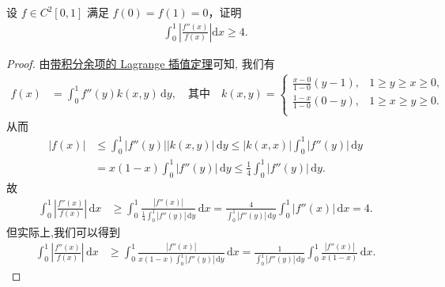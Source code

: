 \documentclass[../../main.tex]{subfiles}%
\begin{document}
\begin{example}
设 $f \in C^2[0,1]$ 满足 $f(0) = f(1) = 0$，证明
\begin{align*}
\int_{0}^{1} \left| \frac{f''(x)}{f(x)} \right| \mathrm{d}x \geqslant  4.
\end{align*}
\end{example}
\begin{proof}

由\hyperref[theorem:带积分型余项的Lagrange插值公式]{带积分余项的 Lagrange 插值定理}可知, 我们有
\begin{align*}
f(x) &= \int_0^1 f''(y) k(x,y) \, \mathrm{d}y, \quad \text{其中} \quad k(x,y) = 
\begin{cases}
\frac{x-0}{1-0}(y-1),&		1\geqslant y\geqslant x\geqslant 0,\\
\frac{1-x}{1-0}(0-y),&		1\geqslant x\geqslant y\geqslant 0.\\
\end{cases}
\end{align*}
从而
\begin{align*}
|f(x)| &\leqslant \int_0^1 |f''(y)| |k(x,y)| \, \mathrm{d}y \leqslant |k(x,x)| \int_0^1 |f''(y)| \, \mathrm{d}y \\
&= x(1-x) \int_0^1 |f''(y)| \, \mathrm{d}y \leqslant \frac{1}{4} \int_0^1 |f''(y)| \, \mathrm{d}y.
\end{align*}
故
\begin{align*}
\int_0^1 \left| \frac{f''(x)}{f(x)} \right| \, \mathrm{d}x &\geqslant \int_0^1 \frac{|f''(x)|}{\frac{1}{4} \int_0^1 |f''(y)| \, \mathrm{d}y} \, \mathrm{d}x = \frac{4}{\int_0^1 |f''(y)| \, \mathrm{d}y} \int_0^1 |f''(x)| \, \mathrm{d}x = 4.
\end{align*}
但实际上,我们可以得到
\begin{align*}
\int_0^1 \left| \frac{f''(x)}{f(x)} \right| \, \mathrm{d}x &\geqslant \int_0^1 \frac{|f''(x)|}{x(1-x) \int_0^1 |f''(y)| \, \mathrm{d}y} \, \mathrm{d}x = \frac{1}{\int_0^1 |f''(y)| \, \mathrm{d}y} \int_0^1 \frac{|f''(x)|}{x(1-x)} \, \mathrm{d}x.
\end{align*}

\end{proof}
\end{document}
